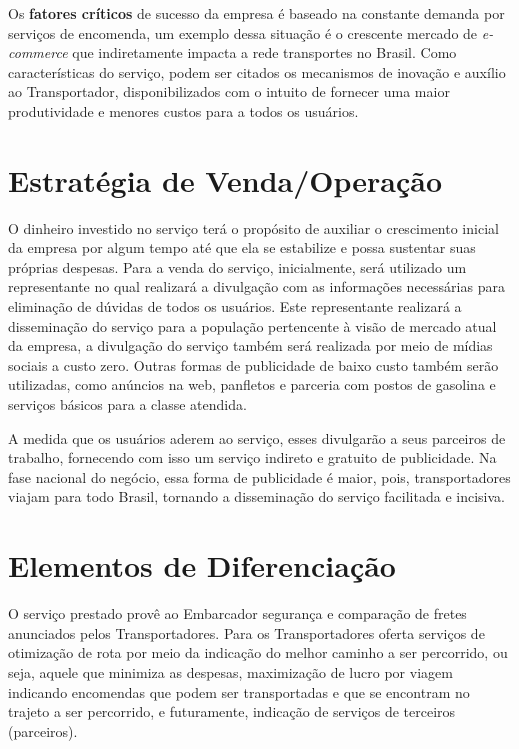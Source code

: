 		Os \textbf{fatores críticos} de sucesso da empresa é baseado na constante demanda por serviços de encomenda, um exemplo dessa situação é o crescente mercado de \textit{e-commerce} que indiretamente impacta a rede transportes no Brasil. Como características do serviço, podem ser citados os mecanismos de inovação e auxílio ao Transportador, disponibilizados com o intuito de fornecer uma maior produtividade e menores custos para a todos os usuários.
		
	\section{Estratégia de Venda/Operação}
	
		O dinheiro investido no serviço terá o propósito de auxiliar o crescimento inicial da empresa por algum tempo até que ela se estabilize e possa sustentar suas próprias despesas. Para a venda do serviço, inicialmente, será utilizado um representante no qual realizará a divulgação com as informações necessárias para eliminação de dúvidas de todos os usuários. Este representante realizará a disseminação do serviço para a população pertencente à visão de mercado atual da empresa, a divulgação do serviço também será realizada por meio de mídias sociais a custo zero. Outras formas de publicidade de baixo custo também serão utilizadas, como anúncios na web, panfletos e parceria com postos de gasolina e serviços básicos para a classe atendida.
		
		A medida que os usuários aderem ao serviço, esses divulgarão a seus parceiros de trabalho, fornecendo com isso um serviço indireto e gratuito de publicidade. Na fase nacional do negócio, essa forma de publicidade é maior, pois, transportadores viajam para todo Brasil, tornando a disseminação do serviço facilitada e incisiva.
		
	\section{Elementos de Diferenciação}
	
		O serviço prestado provê ao Embarcador segurança e comparação de fretes anunciados pelos Transportadores. Para os Transportadores oferta serviços de otimização de rota por meio da indicação do melhor caminho a ser percorrido, ou seja, aquele que minimiza as despesas, maximização de lucro por viagem indicando encomendas que podem ser transportadas e que se encontram no trajeto a ser percorrido, e futuramente, indicação de serviços de terceiros (parceiros).
		
